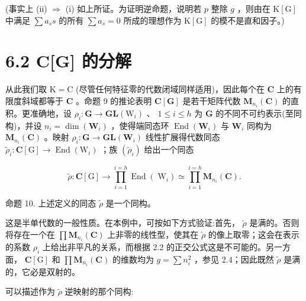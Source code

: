 \documentclass[10pt]{article}
\begin{document}
(事实上 (ii) \(\Rightarrow\) (i) 如上所证。为证明逆命题，说明若 \(p\) 整除 \(g\) ，则由在 \(\mathrm{K}\left\lbrack  \mathrm{G}\right\rbrack\) 中满足 \(\sum {a}_{s}s\) 的所有 \(\sum {a}_{s} = 0\) 所成的理想作为 \(\mathrm{K}\left\lbrack  \mathrm{G}\right\rbrack\) 的模不是直和因子。)

\section*{6.2 C[G] 的分解}

从此我们取 \(\mathrm{K} = \mathrm{C}\) (尽管任何特征零的代数闭域同样适用)，因此每个在 \(\mathbf{C}\) 上的有限度斜域都等于 \(\mathbf{C}\) 。命题 9 的推论表明 \(\mathbf{C}\left\lbrack  \mathbf{G}\right\rbrack\) 是若干矩阵代数 \({\mathbf{M}}_{{n}_{i}}\left( \mathbf{C}\right)\) 的直积。更准确地，设 \({\rho }_{i} : \mathbf{G} \rightarrow  \mathbf{{GL}}\left( {\mathrm{W}}_{i}\right)\) 、 \(1 \leq  i \leq  h\) 为 \(\mathbf{G}\) 的不同不可约表示(至同构)，并设 \({n}_{i} = \dim \left( {\mathbf{W}}_{i}\right)\) ，使得端同态环 \(\operatorname{End}\left( {\mathbf{W}}_{i}\right)\) 与 \({\mathbf{W}}_{i}\) 同构为 \({\mathbf{M}}_{{n}_{i}}\left( \mathbf{C}\right)\) 。映射 \({\rho }_{i} : \mathbf{G} \rightarrow  \mathbf{{GL}}\left( {\mathbf{W}}_{i}\right)\) 线性扩展得代数同态 \({\widetilde{\rho }}_{i} : \mathbf{C}\left\lbrack  \mathrm{G}\right\rbrack   \rightarrow  \operatorname{End}\left( {\mathrm{W}}_{i}\right)\) ；族 \(\left( {\widetilde{\rho }}_{i}\right)\) 给出一个同态

\[
\widetilde{\rho } : \mathbf{C}\left\lbrack  \mathrm{G}\right\rbrack   \rightarrow  \mathop{\prod }\limits_{{i = 1}}^{{i = h}}\operatorname{End}\left( {\mathrm{\;W}}_{i}\right)  \simeq  \mathop{\prod }\limits_{{i = 1}}^{{i = h}}{\mathbf{M}}_{{n}_{i}}\left( \mathbf{C}\right) .
\]

命题 10. 上述定义的同态 \(\widetilde{\rho }\) 是一个同构。

这是半单代数的一般性质。在本例中，可按如下方式验证:首先， \(\widetilde{\rho }\) 是满的。否则将存在一个在 \(\prod {\mathbf{M}}_{{n}_{i}}\left( \mathbf{C}\right)\) 上非零的线性型，使其在 \(\widetilde{\rho }\) 的像上取零；这会在表示的系数 \({\rho }_{i}\) 上给出非平凡的关系，而根据 2.2 的正交公式这是不可能的。另一方面， \(\mathbf{C}\left\lbrack  \mathrm{G}\right\rbrack\) 和 \(\prod {\mathbf{M}}_{{n}_{i}}\left( \mathbf{C}\right)\) 的维数均为 \(g = \sum {n}_{i}^{2}\) ，参见 2.4；因此既然 \(\widetilde{\rho }\) 是满的，它必是双射的。

可以描述作为 \(\widetilde{\rho }\) 逆映射的那个同构:
\end{document}
